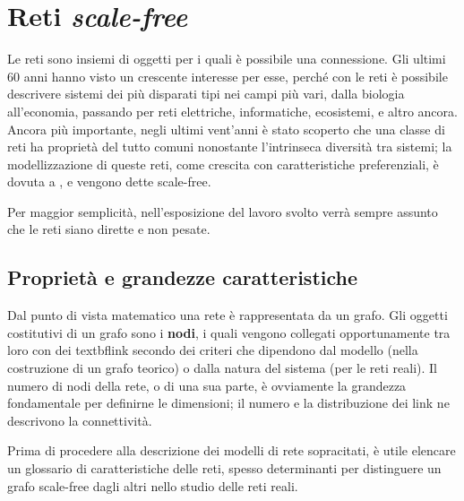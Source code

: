 
\section{Reti \emph{scale-free}}
\label{sec:teoria}
Le reti sono insiemi di oggetti per i quali è possibile una connessione. Gli ultimi 60 anni hanno visto un crescente interesse per esse, perché con le reti è possibile descrivere sistemi dei più disparati tipi nei campi più vari, dalla biologia all'economia, passando per reti elettriche, informatiche, ecosistemi,  e altro ancora. Ancora più importante, negli ultimi vent'anni è stato scoperto che una classe di reti ha proprietà del tutto comuni nonostante l'intrinseca diversità tra sistemi; la modellizzazione di queste reti, come crescita con caratteristiche preferenziali, è dovuta a \textcite{Barbalbert1999}, e vengono dette scale-free.

Per maggior semplicità, nell'esposizione del lavoro svolto verrà sempre assunto che le reti siano dirette e non pesate.

\subsection{Proprietà e grandezze caratteristiche}
Dal punto di vista matematico una rete è rappresentata da un grafo. Gli oggetti costitutivi di un grafo sono i \textbf{nodi}, i quali vengono collegati opportunamente tra loro con dei textbf{link} secondo dei criteri che dipendono dal modello (nella costruzione di un grafo teorico) o dalla natura del sistema (per le reti reali). Il numero di nodi della rete, o di una sua parte, è ovviamente la grandezza fondamentale per definirne le dimensioni; il numero e la distribuzione dei link ne descrivono la connettività.

Prima di procedere alla descrizione dei modelli di rete sopracitati, è utile elencare un glossario di caratteristiche delle reti, spesso determinanti per distinguere un grafo scale-free dagli altri nello studio delle reti reali.

